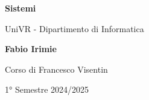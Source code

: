 \begin{titlepage}
	\begin{center}
		\vspace*{1cm}

		\Huge
		\textbf{Sistemi}

		\vspace{0.5cm}
		\LARGE
		UniVR - Dipartimento di Informatica

		\vspace{1.5cm}

		\textbf{Fabio Irimie}

		\vfill


		\vspace{0.8cm}

    Corso di Francesco Visentin

		1° Semestre 2024/2025

	\end{center}
\end{titlepage}
